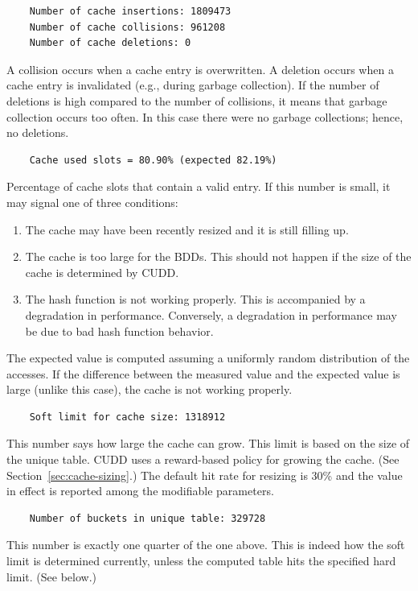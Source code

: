 \documentclass[11pt]{article}
\begin{document}
\begin{verbatim}
    Number of cache insertions: 1809473
    Number of cache collisions: 961208
    Number of cache deletions: 0
\end{verbatim}
A collision occurs when a cache entry is
overwritten. A deletion
occurs when a cache entry is invalidated (e.g., during garbage
collection).  If the number of deletions is high compared to the
number of collisions, it means that garbage collection occurs too
often. In this case there were no garbage collections; hence, no
deletions.

\begin{verbatim}
    Cache used slots = 80.90% (expected 82.19%)
\end{verbatim}
Percentage of cache slots that contain a valid entry. If this
number is small, it may signal one of three conditions:
\begin{enumerate}
\item The cache may have been recently resized and it is still filling
  up.
\item The cache is too large for the BDDs. This should not happen if
  the size of the cache is determined by CUDD.
\item The hash function is not working properly. This is accompanied
  by a degradation in performance. Conversely, a degradation in
  performance may be due to bad hash function behavior.
\end{enumerate}
The expected value is computed assuming a uniformly random
distribution of the accesses.  If the difference between the measured
value and the expected value is large (unlike this case), the cache is
not working properly.

\begin{verbatim}
    Soft limit for cache size: 1318912
\end{verbatim}
This number says how large the cache can grow. This limit is based on
the size of the unique table.  CUDD uses a reward-based policy for
growing the cache. (See Section~\ref{sec:cache-sizing}.)  The default
hit rate for resizing is 30\% and the value in effect is reported
among the modifiable parameters.

\begin{verbatim}
    Number of buckets in unique table: 329728
\end{verbatim}
This number is exactly one quarter of the one above. This is indeed
how the soft limit is determined currently, unless the computed table
hits the specified hard limit. (See below.)
\end{document}
